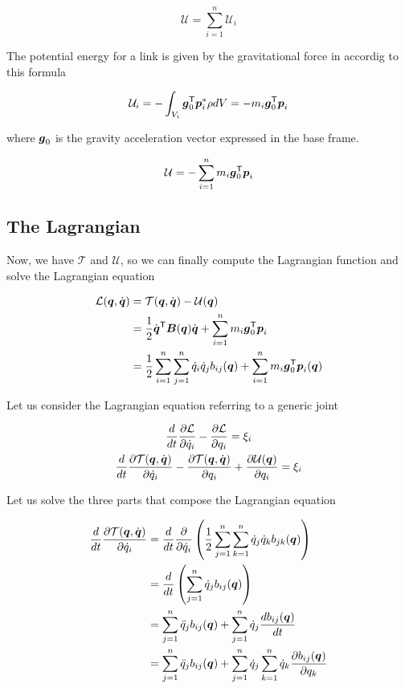 \[
	\mathcal{U} = \sum_{i=1}^n \mathcal{U}_i
\]

The potential energy for a link is given by the gravitational force in accordig to this formula

\[
	\mathcal{U}_i = - \int_{V_i} \boldsymbol{g}_0^{\mathsf{T}} \boldsymbol{p}_i^* \rho dV =
	- m_i \boldsymbol{g}_0^{\mathsf{T}} \boldsymbol{p}_i
\]

where $\boldsymbol{g}_0$ is the gravity acceleration vector expressed in the base frame.

\[
	\mathcal{U} = - \sum_{i=1}^n m_i \boldsymbol{g}_0^{\mathsf{T}} \boldsymbol{p}_i
\]

\subsection{The Lagrangian}

Now, we have $\mathcal{T}$ and $\mathcal{U}$, so we can finally compute the Lagrangian function and solve the Lagrangian equation

\begin{align*}
    \mathcal{L}(\boldsymbol{q},\dot{\boldsymbol{q}}) &= \mathcal{T}(\boldsymbol{q},\dot{\boldsymbol{q}}) - \mathcal{U}(\boldsymbol{q}) \\
    &= \frac{1}{2} \dot{\boldsymbol{q}}^{\mathsf{T}} \boldsymbol{B}(\boldsymbol{q}) \dot{\boldsymbol{q}} + \sum_{i=1}^n m_i \boldsymbol{g}_0^{\mathsf{T}} \boldsymbol{p}_i \\
    &= \frac{1}{2} \sum_{i=1}^n \sum_{j=1}^n \dot{q}_i \dot{q}_j b_{ij}(\boldsymbol{q}) + \sum_{i=1}^n m_i \boldsymbol{g}_0^{\mathsf{T}} \boldsymbol{p}_i(\boldsymbol{q})
\end{align*}

Let us consider the Lagrangian equation referring to a generic joint

\begin{gather}
    \frac{d}{dt}\frac{\partial \mathcal{L}}{\partial \dot{q}_i} - \frac{\partial \mathcal{L}}{\partial q_i} = \xi_i  \nonumber \\
    \frac{d}{dt}\frac{\partial \mathcal{T}(\boldsymbol{q},\dot{\boldsymbol{q}})}{\partial \dot{q}_i} -
    \frac{\partial \mathcal{T}(\boldsymbol{q},\dot{\boldsymbol{q}})}{\partial q_i} +
    \frac{\partial \mathcal{U}(\boldsymbol{q})}{\partial q_i} = \xi_i \label{eq:lagrange-kinetics-potential}
\end{gather}

Let us solve the three parts that compose the Lagrangian equation

\begin{align*}
    \frac{d}{dt}\frac{\partial \mathcal{T}(\boldsymbol{q},\dot{\boldsymbol{q}})}{\partial \dot{q}_i}
    &= \frac{d}{dt}\frac{\partial}{\partial \dot{q}_i} \left( \frac{1}{2} \sum_{j=1}^n \sum_{k=1}^n \dot{q}_j \dot{q}_k b_{jk}(\boldsymbol{q}) \right) \\
    &= \frac{d}{dt} \left( \sum_{j=1}^n \dot{q}_j b_{ij}(\boldsymbol{q}) \right) \\
    &= \sum_{j=1}^n \ddot{q}_j b_{ij}(\boldsymbol{q}) + \sum_{j=1}^n \dot{q}_j \frac{d b_{ij}(\boldsymbol{q})}{dt} \\
	&= \sum_{j=1}^n \ddot{q}_j b_{ij}(\boldsymbol{q}) + \sum_{j=1}^n \dot{q}_j \sum_{k=1}^n \dot{q}_k \frac{\partial b_{ij}(\boldsymbol{q})}{\partial q_k}
\end{align*}


